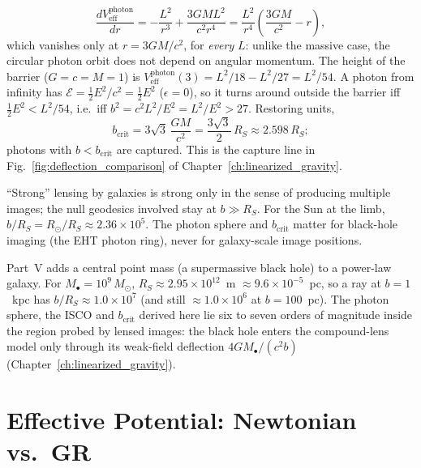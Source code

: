 \begin{derivation}
\[
\frac{dV_{\mathrm{eff}}^{\mathrm{photon}}}{dr}
= -\frac{L^2}{r^3} + \frac{3GML^2}{c^2r^4}
= \frac{L^2}{r^4}\left(\frac{3GM}{c^2} - r\right) ,
\]
which vanishes only at $r = 3GM/c^2$, for \emph{every} $L$: unlike the
massive case, the circular photon orbit does not depend on angular
momentum.  The height of the barrier ($G = c = M = 1$) is
$V^{\mathrm{photon}}_{\mathrm{eff}}(3) = L^2/18 - L^2/27 = L^2/54$.
A photon from infinity has $\mathcal{E} = \tfrac12E^2/c^2 = \tfrac12E^2$
($\epsilon = 0$), so it turns around outside the barrier iff
$\tfrac12E^2 < L^2/54$, i.e.\ iff $b^2 = c^2L^2/E^2 = L^2/E^2 > 27$.  Restoring units,
\[
b_{\mathrm{crit}} = 3\sqrt3\,\frac{GM}{c^2} = \frac{3\sqrt3}{2}\,R_S
\approx 2.598\,R_S ;
\]
photons with $b < b_{\mathrm{crit}}$ are captured.  This is the capture
line in Fig.~\ref{fig:deflection_comparison} of
Chapter~\ref{ch:linearized_gravity}.
\end{derivation}

\begin{annotation}
``Strong'' lensing by galaxies is strong only in the sense of producing
multiple images; the null geodesics involved stay at $b \gg R_S$.  For the
Sun at the limb, $b/R_S = R_\odot/R_S \approx 2.36\times10^5$.  The photon
sphere and $b_{\mathrm{crit}}$ matter for black-hole imaging (the EHT
photon ring), never for galaxy-scale image positions.
\end{annotation}

\begin{bridge}
Part~V adds a central point mass (a supermassive black hole) to a
power-law galaxy.  For $M_\bullet = 10^9\,M_\odot$,
$R_S \approx 2.95\times10^{12}$~m $\approx 9.6\times10^{-5}$~pc, so a ray
at $b = 1$~kpc has $b/R_S \approx 1.0\times10^7$ (and still
$\approx 1.0\times10^6$ at $b = 100$~pc).  The photon sphere, the ISCO and
$b_{\mathrm{crit}}$ derived here lie six to seven orders of magnitude
inside the region probed by lensed images: the black hole enters the
compound-lens model only through its weak-field deflection $4GM_\bullet/(c^2b)$
(Chapter~\ref{ch:linearized_gravity}).
\end{bridge}



\section{Effective Potential: Newtonian vs.\ GR}
\label{sec:veff_comparison}

